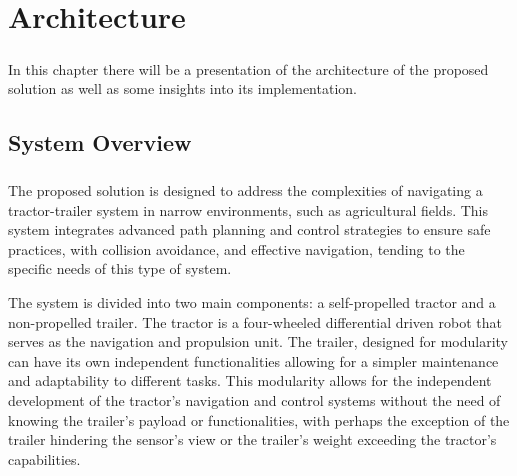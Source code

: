 
%

\chapter{Architecture}
\label{cha:architecture}

\paragraph{}In this chapter there will be a presentation of the architecture of the proposed solution as well as some insights into its 
implementation.

\section{System Overview}
\label{sec:systemoverview}
\paragraph{}The proposed solution is designed to address the complexities of navigating a 
tractor-trailer system in narrow environments, such as agricultural fields. This system integrates 
advanced path planning and control strategies to ensure safe practices, with collision avoidance, and 
effective navigation, tending to the specific needs of this type of system.

The system is divided into two main components: a self-propelled tractor and a non-propelled trailer. 
The tractor is a four-wheeled differential driven robot that serves as the 
navigation and propulsion unit. The trailer, designed for modularity can have its own independent functionalities 
allowing for a simpler maintenance and adaptability to different tasks. This modularity allows 
for the independent development of the tractor's navigation and control systems without 
the need of knowing the trailer's payload or functionalities, with perhaps the exception 
of the trailer hindering the sensor's view or the trailer's weight exceeding the 
tractor's capabilities.


